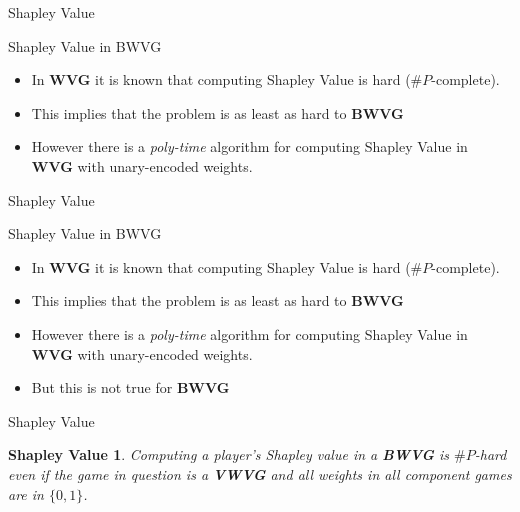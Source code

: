 \documentclass{beamer}
\begin{document}
\begin{frame}[fragile]{Shapley Value}
  \begin{block}{Shapley Value in BWVG}
    \begin{itemize}
      \item In \textbf{WVG} it is known that computing Shapley Value is hard ($\# P$-complete).
      \item This implies that the problem is as least as hard to \textbf{BWVG}
      \item However there is a \textit{poly-time} algorithm for computing Shapley Value in \textbf{WVG} with unary-encoded weights.
    \end{itemize}
  \end{block}
\end{frame}

\begin{frame}[fragile]{Shapley Value}
  \begin{block}{Shapley Value in BWVG}
    \begin{itemize}
      \item In \textbf{WVG} it is known that computing Shapley Value is hard ($\# P$-complete).
      \item This implies that the problem is as least as hard to \textbf{BWVG}
      \item However there is a \textit{poly-time} algorithm for computing Shapley Value in \textbf{WVG} with unary-encoded weights.
      \item But this is not true for \textbf{BWVG}
    \end{itemize}
  \end{block}
\end{frame}

\begin{frame}[fragile]{Shapley Value}
  \newtheorem{theorem5}{Shapley Value}
  \begin{theorem5}
    Computing a player's Shapley value in a \textbf{BWVG} is $\# P$-hard even if the game in question is a \textbf{VWVG}
    and all weights in all component games are in $\{0,1\}$.
  \end{theorem5}
\end{frame}
\end{document}
